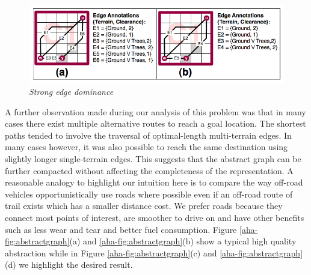 \begin{figure}[htbp]
	\vspace{-12pt}
        \caption{\emph{Strong edge dominance} }
        \begin{center}
                        \includegraphics[scale=0.3, trim = 20mm 7mm 20mm 5mm]{diagrams/intraedges_initial.png}
        \end{center}
        \label{aha-fig:strongdominance}
	\vspace{-5pt}
\end{figure}
A further observation made during our analysis of this problem was that in many cases there exist multiple alternative routes to reach a goal location.
The shortest paths tended to involve the traversal of optimal-length multi-terrain edges. In many cases however, it was also possible to reach the same destination using slightly longer single-terrain edges.
This suggests that the abstract graph can be further compacted without affecting the completeness of the representation.
A reasonable analogy to highlight our intuition here is to compare the way off-road vehicles opportunistically use roads where possible even if an off-road route of trail exists which has a smaller distance cost.
We prefer roads because they connect most points of interest, are smoother to drive on and have other benefits such as less wear and tear and better fuel consumption.
Figure \ref{aha-fig:abstractgraph}(a) and \ref{aha-fig:abstractgraph}(b) show a typical high quality abstraction while in Figure \ref{aha-fig:abstractgraph}(c) and \ref{aha-fig:abstractgraph}(d) we highlight the desired result. 
